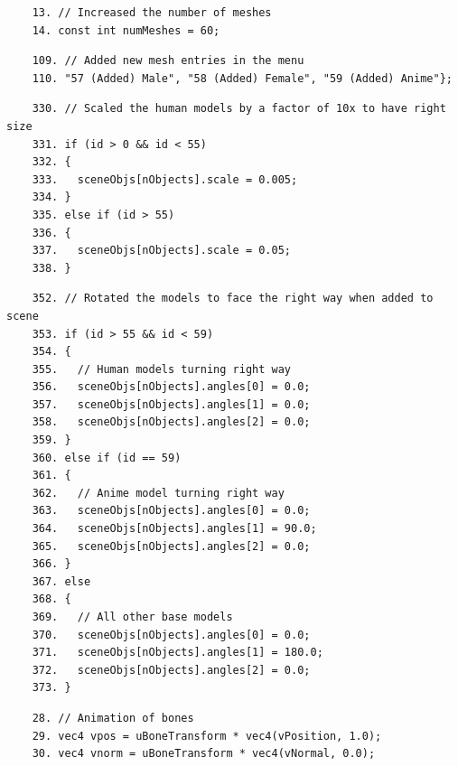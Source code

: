 \documentclass{article}
\begin{document}
\begin{commandlineG}
	\begin{verbatim}
	13. // Increased the number of meshes
	14. const int numMeshes = 60;
	\end{verbatim}
\end{commandlineG}

\begin{commandlineG}
	\begin{verbatim}
	109. // Added new mesh entries in the menu
	110. "57 (Added) Male", "58 (Added) Female", "59 (Added) Anime"};
	\end{verbatim}
\end{commandlineG}

\begin{commandline}
	\begin{verbatim}
	330. // Scaled the human models by a factor of 10x to have right size
	331. if (id > 0 && id < 55)
	332. {
	333.   sceneObjs[nObjects].scale = 0.005;
	334. }
	335. else if (id > 55)
	336. {
	337.   sceneObjs[nObjects].scale = 0.05;
	338. }
	\end{verbatim}
\end{commandline}

\begin{commandline}
	\begin{verbatim}
	352. // Rotated the models to face the right way when added to scene
	353. if (id > 55 && id < 59)
	354. {
	355.   // Human models turning right way
	356.   sceneObjs[nObjects].angles[0] = 0.0;
	357.   sceneObjs[nObjects].angles[1] = 0.0;
	358.   sceneObjs[nObjects].angles[2] = 0.0;
	359. }
	360. else if (id == 59)
	361. {
	362.   // Anime model turning right way
	363.   sceneObjs[nObjects].angles[0] = 0.0;
	364.   sceneObjs[nObjects].angles[1] = 90.0;
	365.   sceneObjs[nObjects].angles[2] = 0.0;
	366. }
	367. else
	368. {
	369.   // All other base models
	370.   sceneObjs[nObjects].angles[0] = 0.0;
	371.   sceneObjs[nObjects].angles[1] = 180.0;
	372.   sceneObjs[nObjects].angles[2] = 0.0;
	373. }
	\end{verbatim}
\end{commandline}


\begin{commandlineV}
	\begin{verbatim}
	28. // Animation of bones
	29. vec4 vpos = uBoneTransform * vec4(vPosition, 1.0);
	30. vec4 vnorm = uBoneTransform * vec4(vNormal, 0.0);
	\end{verbatim}
\end{commandlineV}
\end{document}
